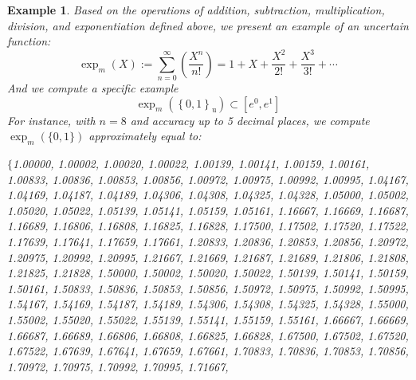 \documentclass[a4paper,12pt,twoside]{memoir}
\newtheorem{example}{Example}[chapter]
\newcommand{\set}[1]{\left\{#1\right\}} %
\newcommand{\s}[1]{\set{#1}_\mathrm{u}} %
\newcommand{\hbd}[2]{#1_m\left(#2\right)} %
\begin{document}
	\begin{example}
		Based on the operations of addition, subtraction, multiplication, division, and exponentiation defined above, we present an example of an uncertain function:
		$$\hbd{\exp}{X} := \sum_{n=0}^{\infty} \left(\frac{X^n}{n!}\right) = 1 + X + \frac{X^2}{2!} + \frac{X^3}{3!} + \cdots$$
		And we compute a specific example $$\hbd{\exp}{\s{0,1}} \subset [e^0,e^1]$$
		For instance, with $n=8$ and accuracy up to 5 decimal places, we compute $\exp_m\left(\{0,1\}\right)$ approximately equal to:
		
		\noindent\begingroup\sloppy
		$\{$1.00000,\allowbreak{} 1.00002,\allowbreak{} 1.00020,\allowbreak{} 1.00022,\allowbreak{} 1.00139,\allowbreak{} 1.00141,\allowbreak{} 1.00159,\allowbreak{} 1.00161,\allowbreak{} 1.00833,\allowbreak{} 1.00836,\allowbreak{} 1.00853,\allowbreak{} 1.00856,\allowbreak{} 1.00972,\allowbreak{} 1.00975,\allowbreak{} 1.00992,\allowbreak{} 1.00995,\allowbreak{} 1.04167,\allowbreak{} 1.04169,\allowbreak{} 1.04187,\allowbreak{} 1.04189,\allowbreak{} 1.04306,\allowbreak{} 1.04308,\allowbreak{} 1.04325,\allowbreak{} 1.04328,\allowbreak{} 1.05000,\allowbreak{} 1.05002,\allowbreak{} 1.05020,\allowbreak{} 1.05022,\allowbreak{} 1.05139,\allowbreak{} 1.05141,\allowbreak{} 1.05159,\allowbreak{} 1.05161,\allowbreak{} 1.16667,\allowbreak{} 1.16669,\allowbreak{} 1.16687,\allowbreak{} 1.16689,\allowbreak{} 1.16806,\allowbreak{} 1.16808,\allowbreak{} 1.16825,\allowbreak{} 1.16828,\allowbreak{} 1.17500,\allowbreak{} 1.17502,\allowbreak{} 1.17520,\allowbreak{} 1.17522,\allowbreak{} 1.17639,\allowbreak{} 1.17641,\allowbreak{} 1.17659,\allowbreak{} 1.17661,\allowbreak{} 1.20833,\allowbreak{} 1.20836,\allowbreak{} 1.20853,\allowbreak{} 1.20856,\allowbreak{} 1.20972,\allowbreak{} 1.20975,\allowbreak{} 1.20992,\allowbreak{} 1.20995,\allowbreak{} 1.21667,\allowbreak{} 1.21669,\allowbreak{} 1.21687,\allowbreak{} 1.21689,\allowbreak{} 1.21806,\allowbreak{} 1.21808,\allowbreak{} 1.21825,\allowbreak{} 1.21828,\allowbreak{} 1.50000,\allowbreak{} 1.50002,\allowbreak{} 1.50020,\allowbreak{} 1.50022,\allowbreak{} 1.50139,\allowbreak{} 1.50141,\allowbreak{} 1.50159,\allowbreak{} 1.50161,\allowbreak{} 1.50833,\allowbreak{} 1.50836,\allowbreak{} 1.50853,\allowbreak{} 1.50856,\allowbreak{} 1.50972,\allowbreak{} 1.50975,\allowbreak{} 1.50992,\allowbreak{} 1.50995,\allowbreak{} 1.54167,\allowbreak{} 1.54169,\allowbreak{} 1.54187,\allowbreak{} 1.54189,\allowbreak{} 1.54306,\allowbreak{} 1.54308,\allowbreak{} 1.54325,\allowbreak{} 1.54328,\allowbreak{} 1.55000,\allowbreak{} 1.55002,\allowbreak{} 1.55020,\allowbreak{} 1.55022,\allowbreak{} 1.55139,\allowbreak{} 1.55141,\allowbreak{} 1.55159,\allowbreak{} 1.55161,\allowbreak{} 1.66667,\allowbreak{} 1.66669,\allowbreak{} 1.66687,\allowbreak{} 1.66689,\allowbreak{} 1.66806,\allowbreak{} 1.66808,\allowbreak{} 1.66825,\allowbreak{} 1.66828,\allowbreak{} 1.67500,\allowbreak{} 1.67502,\allowbreak{} 1.67520,\allowbreak{} 1.67522,\allowbreak{} 1.67639,\allowbreak{} 1.67641,\allowbreak{} 1.67659,\allowbreak{} 1.67661,\allowbreak{} 1.70833,\allowbreak{} 1.70836,\allowbreak{} 1.70853,\allowbreak{} 1.70856,\allowbreak{} 1.70972,\allowbreak{} 1.70975,\allowbreak{} 1.70992,\allowbreak{} 1.70995,\allowbreak{} 1.71667,\allowbreak{} 
\end{example}
\end{document}
